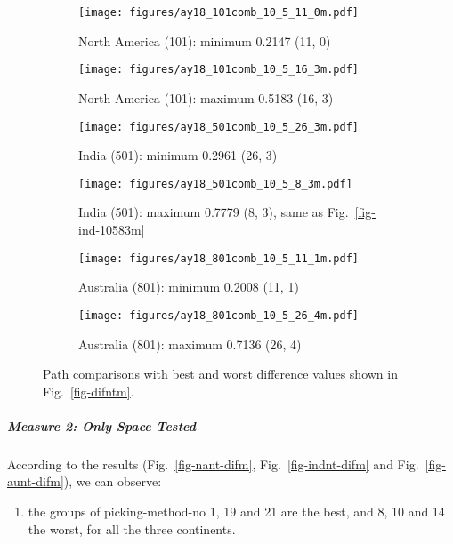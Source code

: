 \begin{figure*}
	\centering
	\begin{subfigure}{.42\textwidth}
		\texttt{[image: figures/ay18\_101comb\_10\_5\_11\_0m.pdf]}
		\caption{North America (101): minimum 0.2147 (11, 0)}\label{fig-nant-105110m}
	\end{subfigure}
	\begin{subfigure}{.42\textwidth}
		\texttt{[image: figures/ay18\_101comb\_10\_5\_16\_3m.pdf]}
		\caption{North America (101): maximum 0.5183 (16, 3)}\label{fig-nant-105163m}
	\end{subfigure}
	\vspace{.1em}
	\begin{subfigure}{.42\textwidth}
		\texttt{[image: figures/ay18\_501comb\_10\_5\_26\_3m.pdf]}
		\caption{India (501): minimum 0.2961 (26, 3)}\label{fig-indnt-105263m}
	\end{subfigure}
	\begin{subfigure}{.42\textwidth}
		\texttt{[image: figures/ay18\_501comb\_10\_5\_8\_3m.pdf]}
		\caption{India (501): maximum 0.7779 (8, 3), same as Fig.~\ref{fig-ind-10583m}}\label{fig-indnt-10583m}
	\end{subfigure}
	\vspace{.1em}
	\begin{subfigure}{.42\textwidth}
		\texttt{[image: figures/ay18\_801comb\_10\_5\_11\_1m.pdf]}
		\caption{Australia (801): minimum 0.2008 (11, 1)}\label{fig-aunt-105111m}
	\end{subfigure}
	\begin{subfigure}{.42\textwidth}
		\texttt{[image: figures/ay18\_801comb\_10\_5\_26\_4m.pdf]}
		\caption{Australia (801): maximum 0.7136 (26, 4)}\label{fig-aunt-105264m}
	\end{subfigure}
	\caption[Best and worst differences without shape test (10 Myr bin, 5 Myr
step)]{Path comparisons with best and worst difference values shown in
Fig.~\ref{fig-difntm}.}\label{fig-difntbwm}
\end{figure*}

\subparagraph{Measure 2: Only Space Tested}

According to the results (Fig.~\ref{fig-nant-difm}, Fig.~\ref{fig-indnt-difm}
and Fig.~\ref{fig-aunt-difm}), we can observe:
%
\begin{enumerate}
  \item the groups of picking-method-no 1, 19 and 21 are the best, and 8, 10
        and 14 the worst, for all the three continents.
\end{enumerate}

